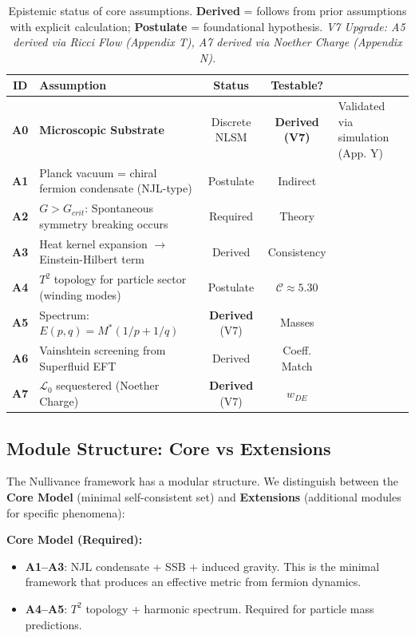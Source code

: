 \documentclass[a4paper,12pt]{article}
\begin{document}
\begin{table}[H]
\centering
\small
\begin{tabular}{clcc}
\toprule
\textbf{ID} & \textbf{Assumption} & \textbf{Status} & \textbf{Testable?} \\
\midrule
    \textbf{A0} & \textbf{Microscopic Substrate} & Discrete NLSM & \textbf{Derived (V7)} & Validated via simulation (App. Y) \\
    \textbf{A1} & Planck vacuum = chiral fermion condensate (NJL-type) & Postulate & Indirect \\
    \textbf{A2} & $G > G_{crit}$: Spontaneous symmetry breaking occurs & Required & Theory \\
    \textbf{A3} & Heat kernel expansion $\to$ Einstein-Hilbert term & Derived & Consistency \\
    \textbf{A4} & $T^2$ topology for particle sector (winding modes) & Postulate & $\mathcal{C} \approx 5.30$ \\
    \textbf{A5} & Spectrum: $E(p,q) = M^*(1/p + 1/q)$ & \textbf{Derived} (V7) & Masses \\
    \textbf{A6} & Vainshtein screening from Superfluid EFT & Derived & Coeff. Match \\
    \textbf{A7} & $\mathcal{L}_0$ sequestered (Noether Charge) & \textbf{Derived} (V7) & $w_{DE}$ \\
    \bottomrule
\end{tabular}
\caption{Epistemic status of core assumptions. \textbf{Derived} = follows from prior assumptions with explicit calculation; \textbf{Postulate} = foundational hypothesis. \textit{V7 Upgrade: A5 derived via Ricci Flow (Appendix T), A7 derived via Noether Charge (Appendix N).}}
\label{tab:assumptions}
\end{table}

\subsection{Module Structure: Core vs Extensions}

The Nullivance framework has a modular structure. We distinguish between the \textbf{Core Model} (minimal self-consistent set) and \textbf{Extensions} (additional modules for specific phenomena):

\textbf{Core Model (Required):}
\begin{itemize}
\item \textbf{A1--A3}: NJL condensate + SSB + induced gravity. This is the minimal framework that produces an effective metric from fermion dynamics.
\item \textbf{A4--A5}: $T^2$ topology + harmonic spectrum. Required for particle mass predictions.
\end{itemize}
\end{document}
